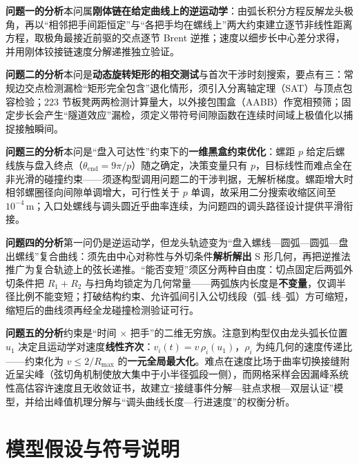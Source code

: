 ﻿\documentclass{cumcmthesis}
\begin{document}
\textbf{问题一的分析}\quad 本问属\textbf{刚体链在给定曲线上的逆运动学}：由弧长积分方程反解龙头极角，再以“相邻把手间距恒定”与“各把手均在螺线上”两大约束建立逐节非线性距离方程，取极角最接近前驱的交点逐节 Brent 逆推；速度以细步长中心差分求得，并用刚体铰接链速度分解递推独立验证。

\textbf{问题二的分析}\quad 本问是\textbf{动态旋转矩形的相交测试}与首次干涉时刻搜索，要点有三：常规边交点检测漏检“矩形完全包含”退化情形，须引入分离轴定理（SAT）与顶点包容检验；$223$ 节板凳两两检测计算量大，以外接包围盒（AABB）作宽相预筛；固定步长会产生“隧道效应”漏检，须定义带符号间隙函数在连续时间域上极值化以捕捉接触瞬间。

\textbf{问题三的分析}\quad 本问是“盘入可达性”约束下的\textbf{一维黑盒约束优化}：螺距 $p$ 给定后螺线族与盘入终点（$\theta_{\mathrm{end}}=9\pi/p$）随之确定，决策变量只有 $p$，目标线性而难点全在非光滑的碰撞约束——须逐构型调用问题二的干涉判据，无解析梯度。螺距增大时相邻螺圈径向间隙单调增大，可行性关于 $p$ 单调，故采用二分搜索收缩区间至 $10^{-4}\,\mathrm{m}$；入口处螺线与调头圆近乎曲率连续，为问题四的调头路径设计提供平滑衔接。

\textbf{问题四的分析}\quad 第一问仍是逆运动学，但龙头轨迹变为“盘入螺线—圆弧—圆弧—盘出螺线”复合曲线：须先由中心对称性与外切条件\textbf{解析解出} S 形几何，再把逆推法推广为复合轨迹上的弦长递推。“能否变短”须区分两种自由度：切点固定后两弧外切条件把 $R_1+R_2$ 与扫角均锁定为几何常量——两弧族内长度是\textbf{不变量}，仅调半径比例不能变短；打破结构约束、允许弧间引入公切线段（弧–线–弧）方可缩短，缩短后的曲线须再经全龙碰撞检测验证可行。

\textbf{问题五的分析}\quad 约束是“时间 $\times$ 把手”的二维无穷族。注意到构型仅由龙头弧长位置 $u_1$ 决定且运动学对速度\textbf{线性齐次}：$v_i(t)=v\,\rho_i(u_1)$，$\rho_i$ 为纯几何的速度传递比——约束化为 $v\le 2/R_{\max}$ 的\textbf{一元全局最大化}。难点在速度比场于曲率切换接缝附近呈尖峰（弦切角机制使放大集中于小半径弧段一侧），而网格采样会因漏峰系统性高估容许速度且无收敛证书，故建立“接缝事件分解—驻点求根—双层认证”模型，并给出峰值机理分解与“调头曲线长度—行进速度”的权衡分析。

\section{模型假设与符号说明}
\end{document}
